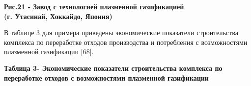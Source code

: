 
{\bfseries Рис.21 - Завод с технологией плазменной газификацией\\
(г. Утасинай, Хоккайдо, Япония)}

В таблице 3 для примера приведены экономические показатели строительства
комплекса по переработке отходов производства и потребления с
возможностями плазменной газификации {[}68{]}.

{\bfseries Таблица 3- Экономические показатели строительства комплекса по
переработке отходов с возможностями плазменной газификации}


